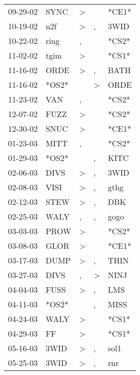 \begin{supertabular}{lllll}
 09-29-02 &   SYNC &     \textgreater &               &  *CE1* \\
 10-19-02 &    n2f &     \textgreater &             , &   3WID \\
 10-22-02 &   ring &                , &               &  *CS2* \\
 11-02-02 &   tgim &     \textgreater &               &  *CS1* \\
 11-16-02 &   ORDE &     \textgreater &             , &   BATH \\
 11-16-02 &  *OS2* &                  &  \textgreater &   ORDE \\
 11-23-02 &    VAN &                , &               &  *CS2* \\
 12-07-02 &   FUZZ &     \textgreater &               &  *CS2* \\
 12-30-02 &   SNUC &     \textgreater &               &  *CE1* \\
 01-23-03 &   MITT &                , &               &  *CS2* \\
 01-29-03 &  *OS2* &                  &             , &   KITC \\
 02-06-03 &   DIVS &     \textgreater &             , &   3WID \\
 02-08-03 &   VISI &     \textgreater &             , &   gthg \\
 02-12-03 &   STEW &     \textgreater &             , &    DBK \\
 02-25-03 &   WALY &                , &             , &   gogo \\
 03-03-03 &   PROW &     \textgreater &               &  *CS2* \\
 03-08-03 &   GLOR &     \textgreater &               &  *CE1* \\
 03-17-03 &   DUMP &     \textgreater &             , &   THIN \\
 03-27-03 &   DIVS &                , &  \textgreater &   NINJ \\
 04-04-03 &   FUSS &     \textgreater &             , &    LMS \\
 04-11-03 &  *OS2* &                  &             , &   MISS \\
 04-24-03 &   WALY &     \textgreater &               &  *CS1* \\
 04-29-03 &     FF &     \textgreater &               &  *CS1* \\
 05-16-03 &   3WID &     \textgreater &             , &   sol1 \\
 05-25-03 &   3WID &     \textgreater &             , &    rnr \\

\end{supertabular}
